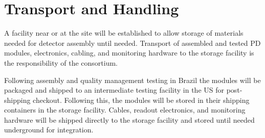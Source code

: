 \section{Transport and Handling}
\label{sec:fdsp-pd-install}


%


A facility near or at the  site will be established to allow storage of materials needed for detector assembly until needed.  Transport of assembled and tested PD modules, electronics, cabling, and monitoring hardware to the  storage facility is the responsibility of the  consortium.



Following assembly and quality management testing in Brazil the  modules  will be packaged and shipped to an intermediate testing facility in the US for post-shipping checkout. Following this, the modules will be stored in their shipping containers in the storage facility.  Cables, readout electronics, and monitoring hardware will be shipped directly to the storage facility and stored until needed underground for integration.

